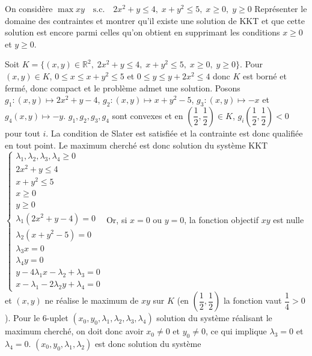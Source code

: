 \documentclass{fancybook}
\begin{document}
\begin{exercice}
On considère $\max xy \quad \text{s.c.} \quad 2x^2+y\leq 4, \; x+y^2\leq 5,\; x\geq 0,\; y\geq 0 $\newline
Représenter le domaine des contraintes et montrer qu'il existe une solution de KKT et que cette solution est encore parmi celles qu'on obtient en supprimant les conditions $x\geq 0$ et $y\geq 0$.
\end{exercice}
Soit $K=\{(x,y)\in \mathbb R^2, \; 2x^2+y\leq 4, \; x+y^2\leq 5,\; x\geq 0,\; y\geq 0\}$. Pour $(x,y)\in K$, $0\leq x\leq x+y^2\leq 5$ et $0\leq y \leq y+2x^2 \leq 4$ donc $K$ est borné et fermé, donc compact et le problème admet une solution. \newline
\newline 
Posons $g_1:(x,y)\mapsto 2x^2+y-4$, $g_2:(x,y)\mapsto x+y^2-5$, $g_3:(x,y)\mapsto -x$ et $g_4(x,y)\mapsto -y$. $g_1,g_2,g_3,g_4$ sont convexes et en $(\dfrac 12,\dfrac 12)\in K$, $g_i(\dfrac 12,\dfrac 12)<0$ pour tout $i$. La condition de Slater est satisfiée et la contrainte est donc qualifiée en tout point.\newline
Le maximum cherché est donc solution du système KKT \newline 
$\begin{cases}
\lambda_1,\lambda_2,\lambda_3,\lambda_4 \geq 0 \\
2x^2+y\leq 4 \\
x+y^2\leq 5 \\
x\geq 0 \\
y\geq 0 \\
\lambda_1 (2x^2+y -4)=0 \\
\lambda_2 (x+y^2- 5)=0 \\
\lambda_3 x =0 \\
\lambda_4 y =0 \\
y-4\lambda_1 x - \lambda_2 + \lambda_3 = 0 \\
x - \lambda_1 - 2 \lambda_2 y + \lambda_4 = 0
\end{cases}$\newline
\newline
Or, si $x=0$ ou $y=0$, la fonction objectif $xy$ est nulle et $(x,y)$ ne réalise le maximum de $xy$ sur $K$ (en $(\dfrac 12, \dfrac 12)$ la fonction vaut $\dfrac 14 >0$). Pour le $6$-uplet $(x_0,y_0,\lambda_1,\lambda_2,\lambda_3,\lambda_4)$ solution du système réalisant le maximum cherché, on doit donc avoir $x_0\neq 0$ et $y_0\neq 0$, ce qui implique $\lambda_3=0$ et $\lambda_4=0$. \newline $(x_0,y_0,\lambda_1,\lambda_2)$ est donc solution du système 
\end{document}

